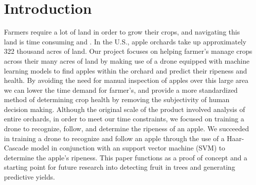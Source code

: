 \section{Introduction}
Farmers require a lot of land in order to grow their crops, and navigating this land is time consuming and .  %
In the U.S., apple orchards take up approximately 322 thousand acres of land. %
Our project focuses on helping farmer's manage crops across their many acres of land by making use of a drone equipped with machine learning models to 
find apples within the orchard and predict their ripeness and health. By avoiding the need for manual inspection of apples over this large area 
we can lower the time demand for farmer's, and provide a more standardized method of determining crop health by removing the subjectivity of human decision making.
Although the original scale of the product involved analysis of entire orchards, in order to meet our time constraints, we focused on training a drone to recognize, follow, and determine the ripeness of an apple. We succeeded in training a drone to recognize and follow an apple through the use of a Haar-Cascade model in conjunction with an support vector machine (SVM) to determine the apple's ripeness. This paper functions as a proof of concept and a starting point for future research into detecting fruit in trees and generating predictive yields.
\\
